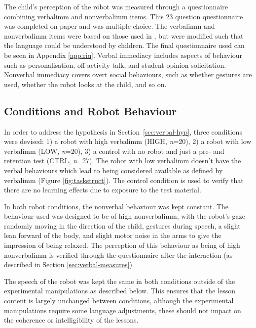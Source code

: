 The child's perception of the robot was measured through a questionnaire combining \gls{verbalimm} and \gls{nonverbalimm} items. This 23 question questionnaire was completed on paper and was multiple choice. The \gls{verbalimm} and \gls{nonverbalimm} items were based on those used in \citet{wilson2007immediacy}, but were modified such that the language could be understood by children. The final questionnaire used can be seen in Appendix \ref{app:riq}. Verbal immediacy includes aspects of behaviour such as personalisation, off-activity talk, and student opinion solicitation. Nonverbal immediacy covers overt social behaviours, such as whether gestures are used, whether the robot looks at the child, and so on.

\subsection{Conditions and Robot Behaviour}\label{sec:verbal-conds}
In order to address the hypothesis in Section~\ref{sec:verbal-hyp}, three conditions were devised: 1) a robot with high \gls{verbalimm} (HIGH, \textit{n}=20), 2) a robot with low \gls{verbalimm} (LOW, \textit{n}=20), 3) a control with no robot and just a pre- and retention test (CTRL, \textit{n}=27). The robot with low \gls{verbalimm} doesn't have the verbal behaviours which lead to being considered available as defined by \gls{verbalimm} (Figure \ref{fig:taskstruct}). The control condition is used to verify that there are no \gls{learning} effects due to exposure to the test material.

In both robot conditions, the nonverbal behaviour was kept constant. The behaviour used was designed to be of high \gls{nonverbalimm}, with the robot's gaze randomly moving in the direction of the child, gestures during speech, a slight lean forward of the body, and slight motor noise in the arms to give the impression of being relaxed. The perception of this behaviour as being of high \gls{nonverbalimm} is verified through the questionnaire after the interaction (as described in Section \ref{sec:verbal-measures}).

The speech of the robot was kept the same in both conditions outside of the experimental manipulations as described below. This ensures that the lesson content is largely unchanged between conditions, although the experimental manipulations require some language adjustments, these should not impact on the coherence or intelligibility of the lessons.

